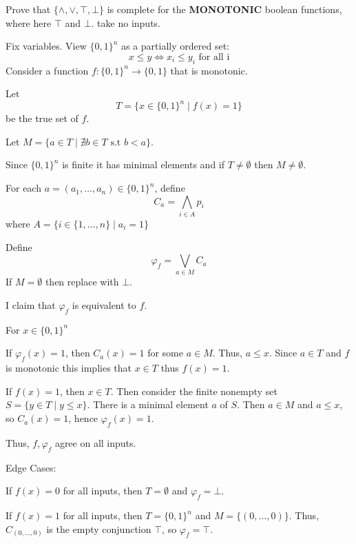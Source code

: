 \documentclass[12pt, letterpaper]{article}
\renewcommand{\t}[1]{\text{#1}}
\begin{document}
\begin{problem}{}
    Prove that $\{\land, \lor, \top, \bot\}$ is complete for the \textbf{MONOTONIC} boolean functions, where here $\top$ and $\bot$.
take no inputs.
\end{problem}
\begin{problemproof}
    Fix variables. View $\{0,1\}^n$ as a partially ordered set:
    \[x \leq y \iff x_i \leq y_i \t{ for all i}\]
    Consider a function $f : \{0,1\}^n \to \{0,1\}$ that is monotonic.

    Let
    \[T = \{x \in \{0,1\}^n \mid f(x)=1\}\]
    be the true set of $f$.

    Let $M=\{a \in T \mid \nexists b \in T \t{ s.t } b < a\}$.

    Since $\{0,1\}^n$ is finite it has minimal elements and if $T \neq \emptyset$ then $M \neq \emptyset$.

    For each $a=(a_1,\dots,a_n) \in \{0,1\}^n$, define
    \[C_a = \bigwedge_{i \in A}p_i\]
    where $A=\{i \in \{1,\dots,n\} \mid a_i=1\}$

    Define \[\varphi_f = \bigvee_{a \in M} C_a\] 
    If $M= \emptyset$ then replace with $\bot$.

    I claim that $\varphi_f$ is equivalent to $f$.

    For $x \in \{0,1\}^n$

    If $\varphi_f(x)=1$, then $C_a(x)=1$ for some $a \in M$. Thus, $a \leq x$. Since $a \in T$ and $f$ is monotonic this implies that $x \in T$ thus $f(x)=1$.

    If $f(x)=1$, then $x \in T$. Then consider the finite nonempty set $S=\{y \in T \mid y \leq x\}$. There is a minimal element $a$ of $S$. Then $a  \in M$ and $a \leq x$, so $C_a(x)=1$, hence $\varphi_f(x)=1$.

    Thus, $f,\varphi_f$ agree on all inputs.

    Edge Cases:

    If $f(x)=0$ for all inputs, then $T=\emptyset$ and $\varphi_f=\bot$.

    If $f(x)=1$ for all inputs, then $T=\{0,1\}^n$ and $M=\{(0,\dots,0)\}$. Thus, $C_{(0,\dots,0)}$ is the empty conjunction $\top$, so $\varphi_f=\top$.
\end{problemproof}
\end{document}
